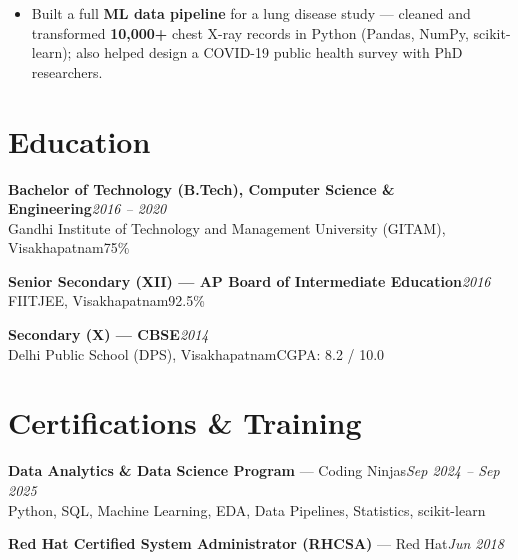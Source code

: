 \documentclass[10pt, letterpaper]{article}
\begin{document}
\begin{itemize}
  \item Built a full \textbf{ML data pipeline} for a lung disease study --- cleaned and transformed \textbf{10,000+} chest X-ray records in Python (Pandas, NumPy, scikit-learn); also helped design a COVID-19 public health survey with PhD researchers.
\end{itemize}

\section{Education}

{\bfseries Bachelor of Technology (B.Tech), Computer Science \& Engineering}\hfill{\small\color{muted}\textit{2016 -- 2020}}\\
{\small\color{muted}Gandhi Institute of Technology and Management University (GITAM), Visakhapatnam\hfill 75\%}

\vspace{2pt}
{\bfseries Senior Secondary (XII) --- AP Board of Intermediate Education}\hfill{\small\color{muted}\textit{2016}}\\
{\small\color{muted}FIITJEE, Visakhapatnam\hfill 92.5\%}

\vspace{2pt}
{\bfseries Secondary (X) --- CBSE}\hfill{\small\color{muted}\textit{2014}}\\
{\small\color{muted}Delhi Public School (DPS), Visakhapatnam\hfill CGPA: 8.2 / 10.0}

\section{Certifications \& Training}

{\bfseries Data Analytics \& Data Science Program} --- Coding Ninjas\hfill{\small\color{muted}\textit{Sep 2024 -- Sep 2025}}\\
{\small\color{muted}Python, SQL, Machine Learning, EDA, Data Pipelines, Statistics, scikit-learn}

\vspace{1pt}
{\bfseries Red Hat Certified System Administrator (RHCSA)} --- Red Hat\hfill{\small\color{muted}\textit{Jun 2018}}

\end{document}
